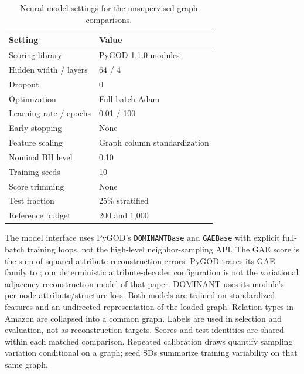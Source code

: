 \documentclass[twoside]{article}
\begin{document}
\begin{table}[ht]
\centering\small\setlength{\tabcolsep}{4pt}
\caption{Neural-model settings for the unsupervised graph comparisons.}
\begin{tabular}{ll}
\toprule Setting & Value\\\midrule
Scoring library & PyGOD 1.1.0 modules\\
Hidden width / layers & 64 / 4\\
Dropout & 0\\
Optimization & Full-batch Adam\\
Learning rate / epochs & 0.01 / 100\\
Early stopping & None\\
Feature scaling & Graph column standardization\\
Nominal BH level & 0.10\\
Training seeds & 10\\
Score trimming & None\\
Test fraction & 25\% stratified\\
Reference budget & 200 and 1,000\\
\bottomrule
\end{tabular}
\end{table}
The model interface uses PyGOD's \texttt{DOMINANTBase} and \texttt{GAEBase} with explicit full-batch training loops, not the high-level neighbor-sampling API. The GAE score is the sum of squared attribute reconstruction errors. PyGOD traces its GAE family to \citet{kipf2016variational}; our deterministic attribute-decoder configuration is not the variational adjacency-reconstruction model of that paper. DOMINANT uses its module's per-node attribute/structure loss. Both models are trained on standardized features and an undirected representation of the loaded graph. Relation types in Amazon are collapsed into a common graph. Labels are used in selection and evaluation, not as reconstruction targets. Scores and test identities are shared within each matched comparison. Repeated calibration draws quantify sampling variation conditional on a graph; seed SDs summarize training variability on that same graph.
\end{document}
